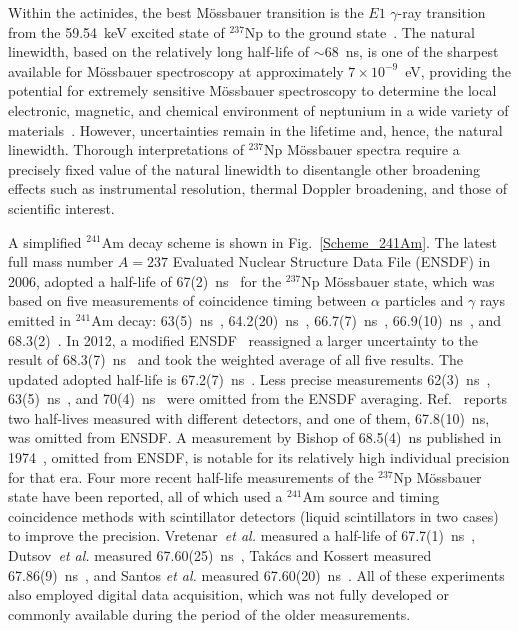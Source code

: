 \documentclass[aps,UTF8,prc,twocolumn,preprintnumbers,amsmath,amssymb,floatfix]{revtex4-2}
\begin{document}
Within the actinides, the best M\"{o}ssbauer transition is the $E1$ $\gamma$-ray transition from the 59.54~keV excited state of $^{237}$Np to the ground state~\cite{Kalvius_JNM1989}. The natural linewidth, based on the relatively long half-life of $\sim$68~ns, is one of the sharpest available for M\"{o}ssbauer spectroscopy at approximately $7\times10^{-9}$~eV, providing the potential for extremely sensitive M\"{o}ssbauer spectroscopy to determine the local electronic, magnetic, and chemical environment of neptunium in a wide variety of materials~\cite{Pillinger_Stone_1968}. However, uncertainties remain in the lifetime and, hence, the natural linewidth. Thorough interpretations of $^{237}$Np M\"{o}ssbauer spectra require a precisely fixed value of the natural linewidth to disentangle other broadening effects such as instrumental resolution, thermal Doppler broadening, and those of scientific interest.  

A simplified $^{241}$Am decay scheme is shown in Fig.~\ref{Scheme_241Am}. The latest full mass number $A=237$ Evaluated Nuclear Structure Data File (ENSDF) in 2006, adopted a half-life of 67(2)~ns~\cite{Basunia_NDS2006_A237} for the $^{237}$Np M\"{o}ssbauer state, which was based on five measurements of coincidence timing between $\alpha$ particles and $\gamma$ rays emitted in $^{241}$Am decay: 
63(5)~ns~\cite{Beling_PR1952}, 64.2(20)~ns~\cite{Oberhofer_Thesis1968}, 66.7(7)~ns~\cite{Garg_ZP1971}, 66.9(10)~ns~\cite{McBeth_NIM1972}, and 68.3(2)~\cite{Miller_NIM1972}. In 2012, a modified ENSDF~\cite{Basunia_ENSDF2012} reassigned a larger uncertainty to the result of 68.3(7)~ns~\cite{Miller_NIM1972} and took the weighted average of all five results. The updated adopted half-life is 67.2(7)~ns~\cite{Basunia_ENSDF2012}. Less precise measurements 62(3)~ns~\cite{Vartapetian_AP1958}, 63(5)~ns~\cite{Unik_Thesis1960}, and 70(4)~ns~\cite{Finck_NIMA1985} were omitted from the ENSDF averaging. Ref.~\cite{McBeth_NIM1972} reports two half-lives measured with different detectors, and one of them, 67.8(10)~ns, was omitted from ENSDF. A measurement by Bishop of 68.5(4)~ns published in 1974~\cite{Bishop_NIM1974}, omitted from ENSDF, is notable for its relatively high individual precision for that era. Four more recent half-life measurements of the $^{237}$Np M\"{o}ssbauer state have been reported, all of which used a $^{241}$Am source and timing coincidence methods with scintillator detectors (liquid scintillators in two cases) to improve the precision. Vretenar~\textit{et al.} measured a half-life of 67.7(1)~ns~\cite{Vretenar_AJP2019}, Dutsov~\textit{et al.} measured 67.60(25)~ns~\cite{Dutsov_ARI2021}, Tak\'{a}cs and Kossert measured 67.86(9)~ns~\cite{Takacs_ARI2021}, and Santos \textit{et al.} measured 67.60(20)~ns~\cite{Santos_NPA2023}. All of these experiments also employed digital data acquisition, which was not fully developed or commonly available during the period of the older measurements.
\end{document}

